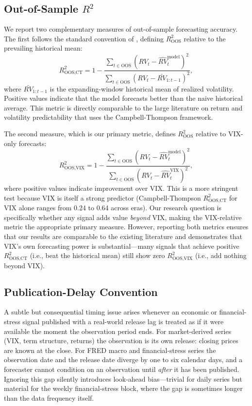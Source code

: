 \documentclass[12pt,a4paper]{article}
\begin{document}
\subsection{Out-of-Sample $R^2$}

We report two complementary measures of out-of-sample forecasting accuracy. The first follows the standard convention of \citet{campbell2008}, defining $R^2_{\text{OOS}}$ relative to the prevailing historical mean:
\begin{equation}
R^2_{\text{OOS,CT}} = 1 - \frac{\sum_{t \in \text{OOS}} (RV_t - \hat{RV}_t^{\text{model}})^2}{\sum_{t \in \text{OOS}} (RV_t - \bar{RV}_{1:t-1})^2},
\label{eq:oos_r2_ct}
\end{equation}
where $\bar{RV}_{1:t-1}$ is the expanding-window historical mean of realized volatility. Positive values indicate that the model forecasts better than the naive historical average. This metric is directly comparable to the large literature on return and volatility predictability that uses the Campbell-Thompson framework.

The second measure, which is our primary metric, defines $R^2_{\text{OOS}}$ relative to VIX-only forecasts:
\begin{equation}
R^2_{\text{OOS,VIX}} = 1 - \frac{\sum_{t \in \text{OOS}} (RV_t - \hat{RV}_t^{\text{model}})^2}{\sum_{t \in \text{OOS}} (RV_t - \hat{RV}_t^{\text{VIX}})^2},
\label{eq:oos_r2}
\end{equation}
where positive values indicate improvement over VIX. This is a more stringent test because VIX is itself a strong predictor (Campbell-Thompson $R^2_{\text{OOS,CT}}$ for VIX alone ranges from 0.24 to 0.64 across eras). Our research question is specifically whether any signal adds value \emph{beyond} VIX, making the VIX-relative metric the appropriate primary measure. However, reporting both metrics ensures that our results are comparable to the existing literature and demonstrates that VIX's own forecasting power is substantial---many signals that achieve positive $R^2_{\text{OOS,CT}}$ (i.e., beat the historical mean) still show zero $R^2_{\text{OOS,VIX}}$ (i.e., add nothing beyond VIX).

\subsection{Publication-Delay Convention}
\label{sec:pub_delay}

A subtle but consequential timing issue arises whenever an economic or financial-stress signal published with a real-world release lag is treated as if it were available the moment the observation period ends. For market-derived series (VIX, term structure, returns) the observation is its own release: closing prices are known at the close. For FRED macro and financial-stress series the observation date and the release date diverge by one to six calendar days, and a forecaster cannot condition on an observation until \emph{after} it has been published. Ignoring this gap silently introduces look-ahead bias---trivial for daily series but material for the weekly financial-stress block, where the gap is sometimes longer than the data frequency itself.
\end{document}
